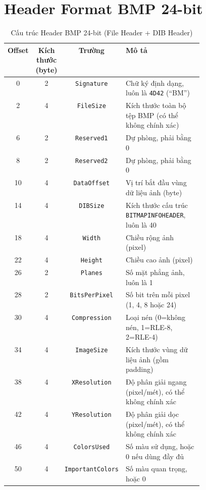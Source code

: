 \section{Header Format BMP 24-bit}
\begin{table}[H]
\centering
\renewcommand{\arraystretch}{1.3}
\begin{tabular}{@{}c c c p{0.45\linewidth}@{}}
\toprule
\textbf{Offset} & \textbf{Kích thước (byte)} & \textbf{Trường} & \textbf{Mô tả} \\
\midrule
0  & 2 & \texttt{Signature} & Chữ ký định dạng, luôn là \texttt{4D42} (``BM'') \\
2  & 4 & \texttt{FileSize} & Kích thước toàn bộ tệp BMP (có thể không chính xác) \\
6  & 2 & \texttt{Reserved1} & Dự phòng, phải bằng 0 \\
8  & 2 & \texttt{Reserved2} & Dự phòng, phải bằng 0 \\
10 & 4 & \texttt{DataOffset} & Vị trí bắt đầu vùng dữ liệu ảnh (byte) \\
14 & 4 & \texttt{DIBSize} & Kích thước cấu trúc \texttt{BITMAPINFOHEADER}, luôn là 40 \\
18 & 4 & \texttt{Width} & Chiều rộng ảnh (pixel) \\
22 & 4 & \texttt{Height} & Chiều cao ảnh (pixel) \\
26 & 2 & \texttt{Planes} & Số mặt phẳng ảnh, luôn là 1 \\
28 & 2 & \texttt{BitsPerPixel} & Số bit trên mỗi pixel (1, 4, 8 hoặc 24) \\
30 & 4 & \texttt{Compression} & Loại nén (0=không nén, 1=RLE-8, 2=RLE-4) \\
34 & 4 & \texttt{ImageSize} & Kích thước vùng dữ liệu ảnh (gồm padding) \\
38 & 4 & \texttt{XResolution} & Độ phân giải ngang (pixel/mét), có thể không chính xác \\
42 & 4 & \texttt{YResolution} & Độ phân giải dọc (pixel/mét), có thể không chính xác \\
46 & 4 & \texttt{ColorsUsed} & Số màu sử dụng, hoặc 0 nếu dùng đầy đủ \\
50 & 4 & \texttt{ImportantColors} & Số màu quan trọng, hoặc 0 \\
\bottomrule
\end{tabular}
\caption{Cấu trúc Header BMP 24-bit (File Header + DIB Header)}
\label{tab:bmp_header}
\end{table}

